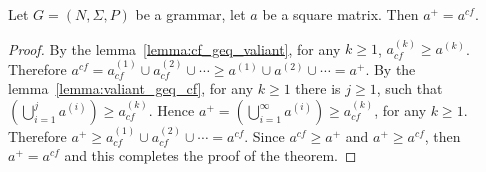 \begin{mytheorem}\label{thm:closures}
	Let $G =(N,\Sigma,P)$ be a grammar, let $a$ be a square matrix. Then $a^+ = a^{cf}$.
\end{mytheorem}
\begin{proof}
	
	By the lemma~\ref{lemma:cf_geq_valiant}, for any $k \geq 1$, $a^{(k)}_{cf} \geq a^{(k)}$. Therefore $a^{cf} = a^{(1)}_{cf} \cup a^{(2)}_{cf} \cup \cdots \geq a^{(1)} \cup a^{(2)} \cup \cdots = a^+$. By the lemma~\ref{lemma:valiant_geq_cf}, for any $k \geq 1$ there is $j \geq 1$, such that $(\bigcup^{j}_{i=1}{a^{(i)}}) \geq a^{(k)}_{cf}$. Hence $a^+ = (\bigcup^{\infty}_{i=1}{a^{(i)}}) \geq a^{(k)}_{cf}$, for any $k \geq 1$. Therefore $a^+ \geq a^{(1)}_{cf} \cup a^{(2)}_{cf} \cup \cdots = a^{cf}$. Since $a^{cf} \geq a^+$ and $a^+ \geq a^{cf}$, then $a^+ = a^{cf}$ and this completes the proof of the theorem.
\end{proof}